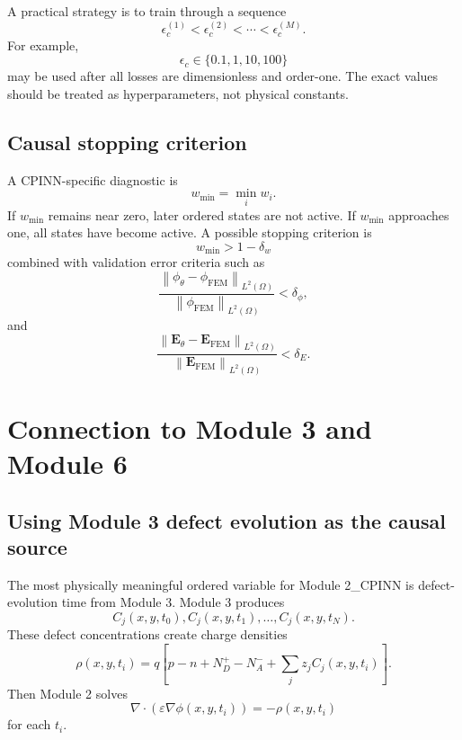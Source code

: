 \documentclass[11pt]{article}
\newcommand{\Evec}{\mathbf{E}}
\newcommand{\Om}{\Omega}
\newcommand{\Norm}[1]{\left\lVert #1 \right\rVert}
\begin{document}
A practical strategy is to train through a sequence
\begin{equation}
\epsilon_c^{(1)}<\epsilon_c^{(2)}<\cdots<\epsilon_c^{(M)}.
\end{equation}
For example,
\begin{equation}
\epsilon_c\in\{0.1,1,10,100\}
\end{equation}
may be used after all losses are dimensionless and order-one. The exact values should be treated as hyperparameters, not physical constants.

\subsection{Causal stopping criterion}

A CPINN-specific diagnostic is
\begin{equation}
w_{\min}=\min_i w_i.
\end{equation}
If $w_{\min}$ remains near zero, later ordered states are not active. If $w_{\min}$ approaches one, all states have become active. A possible stopping criterion is
\begin{equation}
w_{\min}>1-\delta_w
\end{equation}
combined with validation error criteria such as
\begin{equation}
\frac{\Norm{\phi_{\theta}-\phi_{\mathrm{FEM}}}_{L^2(\Om)}}
{\Norm{\phi_{\mathrm{FEM}}}_{L^2(\Om)}}<\delta_{\phi},
\end{equation}
and
\begin{equation}
\frac{\Norm{\Evec_{\theta}-\Evec_{\mathrm{FEM}}}_{L^2(\Om)}}
{\Norm{\Evec_{\mathrm{FEM}}}_{L^2(\Om)}}<\delta_E.
\end{equation}

\section{Connection to Module 3 and Module 6}

\subsection{Using Module 3 defect evolution as the causal source}

The most physically meaningful ordered variable for Module 2\_CPINN is defect-evolution time from Module 3. Module 3 produces
\begin{equation}
C_j(x,y,t_0),C_j(x,y,t_1),\ldots,C_j(x,y,t_N).
\end{equation}
These defect concentrations create charge densities
\begin{equation}
\rho(x,y,t_i)=q\left[p-n+N_D^+-N_A^-+\sum_j z_j C_j(x,y,t_i)\right].
\end{equation}
Then Module 2 solves
\begin{equation}
\nabla\cdot\left(\varepsilon\nabla\phi(x,y,t_i)\right)=-\rho(x,y,t_i)
\end{equation}
for each $t_i$.
\end{document}
